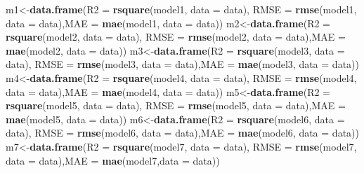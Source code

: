 \documentclass[
]{article}
\newenvironment{Shaded}{\begin{snugshade}}{\end{snugshade}}
\newcommand{\AttributeTok}[1]{\textcolor[rgb]{0.13,0.29,0.53}{#1}}
\newcommand{\FunctionTok}[1]{\textcolor[rgb]{0.13,0.29,0.53}{\textbf{#1}}}
\newcommand{\NormalTok}[1]{#1}
\newcommand{\OtherTok}[1]{\textcolor[rgb]{0.56,0.35,0.01}{#1}}
\begin{document}
\begin{Shaded}
\begin{Highlighting}[]
\NormalTok{m1}\OtherTok{\textless{}{-}}\FunctionTok{data.frame}\NormalTok{(}\AttributeTok{R2 =} \FunctionTok{rsquare}\NormalTok{(model1, }\AttributeTok{data =}\NormalTok{ data), }\AttributeTok{RMSE =} \FunctionTok{rmse}\NormalTok{(model1, }\AttributeTok{data =}\NormalTok{ data),}\AttributeTok{MAE =} \FunctionTok{mae}\NormalTok{(model1, }\AttributeTok{data =}\NormalTok{ data))}
\NormalTok{m2}\OtherTok{\textless{}{-}}\FunctionTok{data.frame}\NormalTok{(}\AttributeTok{R2 =} \FunctionTok{rsquare}\NormalTok{(model2, }\AttributeTok{data =}\NormalTok{ data), }\AttributeTok{RMSE =} \FunctionTok{rmse}\NormalTok{(model2, }\AttributeTok{data =}\NormalTok{ data),}\AttributeTok{MAE =} \FunctionTok{mae}\NormalTok{(model2, }\AttributeTok{data =}\NormalTok{ data))}
\NormalTok{m3}\OtherTok{\textless{}{-}}\FunctionTok{data.frame}\NormalTok{(}\AttributeTok{R2 =} \FunctionTok{rsquare}\NormalTok{(model3, }\AttributeTok{data =}\NormalTok{ data), }\AttributeTok{RMSE =} \FunctionTok{rmse}\NormalTok{(model3, }\AttributeTok{data =}\NormalTok{ data),}\AttributeTok{MAE =} \FunctionTok{mae}\NormalTok{(model3, }\AttributeTok{data =}\NormalTok{ data))}
\NormalTok{m4}\OtherTok{\textless{}{-}}\FunctionTok{data.frame}\NormalTok{(}\AttributeTok{R2 =} \FunctionTok{rsquare}\NormalTok{(model4, }\AttributeTok{data =}\NormalTok{ data), }\AttributeTok{RMSE =} \FunctionTok{rmse}\NormalTok{(model4, }\AttributeTok{data =}\NormalTok{ data),}\AttributeTok{MAE =} \FunctionTok{mae}\NormalTok{(model4, }\AttributeTok{data =}\NormalTok{ data))}
\NormalTok{m5}\OtherTok{\textless{}{-}}\FunctionTok{data.frame}\NormalTok{(}\AttributeTok{R2 =} \FunctionTok{rsquare}\NormalTok{(model5, }\AttributeTok{data =}\NormalTok{ data), }\AttributeTok{RMSE =} \FunctionTok{rmse}\NormalTok{(model5, }\AttributeTok{data =}\NormalTok{ data),}\AttributeTok{MAE =} \FunctionTok{mae}\NormalTok{(model5, }\AttributeTok{data =}\NormalTok{ data))}
\NormalTok{m6}\OtherTok{\textless{}{-}}\FunctionTok{data.frame}\NormalTok{(}\AttributeTok{R2 =} \FunctionTok{rsquare}\NormalTok{(model6, }\AttributeTok{data =}\NormalTok{ data), }\AttributeTok{RMSE =} \FunctionTok{rmse}\NormalTok{(model6, }\AttributeTok{data =}\NormalTok{ data),}\AttributeTok{MAE =} \FunctionTok{mae}\NormalTok{(model6, }\AttributeTok{data =}\NormalTok{ data))}
\NormalTok{m7}\OtherTok{\textless{}{-}}\FunctionTok{data.frame}\NormalTok{(}\AttributeTok{R2 =} \FunctionTok{rsquare}\NormalTok{(model7, }\AttributeTok{data =}\NormalTok{ data), }\AttributeTok{RMSE =}  \FunctionTok{rmse}\NormalTok{(model7, }\AttributeTok{data =}\NormalTok{ data),}\AttributeTok{MAE =} \FunctionTok{mae}\NormalTok{(model7,}\AttributeTok{data =}\NormalTok{ data))}

\end{Highlighting}
\end{Shaded}
\end{document}

